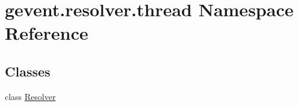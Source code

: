 \hypertarget{namespacegevent_1_1resolver_1_1thread}{}\section{gevent.\+resolver.\+thread Namespace Reference}
\label{namespacegevent_1_1resolver_1_1thread}
\subsection*{Classes}
\begin{DoxyCompactItemize}
\item 
class \hyperlink{classgevent_1_1resolver_1_1thread_1_1_resolver}{Resolver}
\end{DoxyCompactItemize}
